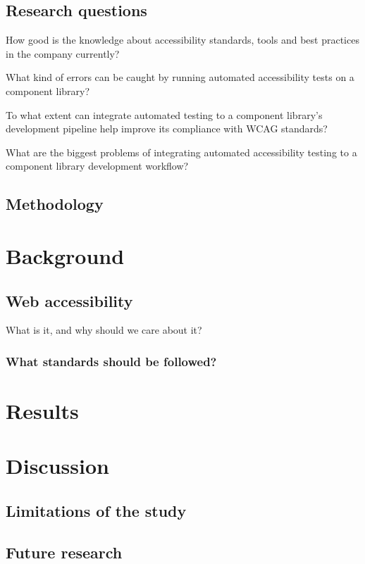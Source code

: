 \documentclass{master_thesis}
\begin{document}
	\subsection{Research questions}

	\begin{RQlist}
		\item How good is the knowledge about accessibility standards, tools and best practices in the company currently?
		\item What kind of errors can be caught by running automated accessibility tests on a component library?
		\item To what extent can integrate automated testing to a component library's development pipeline help improve its compliance with WCAG standards?
		\item What are the biggest problems of integrating automated accessibility testing to a component library development workflow?
	\end{RQlist}
	\subsection{Methodology}

\section{Background}
	\subsection{Web accessibility}
	What is it, and why should we care about it?
		\subsubsection{What standards should be followed?}




\section{Results}
\section{Discussion}
	\subsection{Limitations of the study}
	\subsection{Future research}
\end{document}
